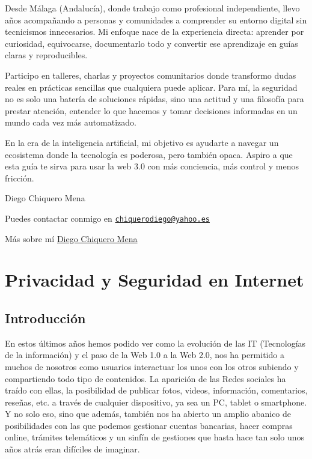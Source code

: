\documentclass[
  a4paper,
  openany]{book}
\begin{document}
Desde Málaga (Andalucía), donde trabajo como profesional independiente, llevo años acompañando a personas y comunidades a comprender su entorno digital sin tecnicismos innecesarios. Mi enfoque nace de la experiencia directa: aprender por curiosidad, equivocarse, documentarlo todo y convertir ese aprendizaje en guías claras y reproducibles.

Participo en talleres, charlas y proyectos comunitarios donde transformo dudas reales en prácticas sencillas que cualquiera puede aplicar. Para mí, la seguridad no es solo una batería de soluciones rápidas, sino una actitud y una filosofía para prestar atención, entender lo que hacemos y tomar decisiones informadas en un mundo cada vez más automatizado.

En la era de la inteligencia artificial, mi objetivo es ayudarte a navegar un ecosistema donde la tecnología es poderosa, pero también opaca. Aspiro a que esta guía te sirva para usar la web 3.0 con más conciencia, más control y menos fricción.

Diego Chiquero Mena

Puedes contactar conmigo en \href{mailto:chiquerodiego@yahoo.es}{\nolinkurl{chiquerodiego@yahoo.es}}

Más sobre mí \href{https://linktr.ee/diegochiquero}{Diego Chiquero Mena}

\hypertarget{privacidad-y-seguridad-en-internet}{%
\chapter{Privacidad y Seguridad en Internet}\label{privacidad-y-seguridad-en-internet}}

\hypertarget{introducciuxf3n}{%
\section{Introducción}\label{introducciuxf3n}}

En estos últimos años hemos podido ver como la evolución de las IT (Tecnologías de la información) y el paso de la Web 1.0 a la Web 2.0, nos ha permitido a muchos de nosotros como usuarios interactuar los unos con los otros subiendo y compartiendo todo tipo de contenidos. La aparición de las Redes sociales ha traído con ellas, la posibilidad de publicar fotos, videos, información, comentarios, reseñas, etc. a través de cualquier dispositivo, ya sea un PC, tablet o smartphone. Y no solo eso, sino que además, también nos ha abierto un amplio abanico de posibilidades con las que podemos gestionar cuentas bancarias, hacer compras online, trámites telemáticos y un sinfín de gestiones que hasta hace tan solo unos años atrás eran difíciles de imaginar.
\end{document}
